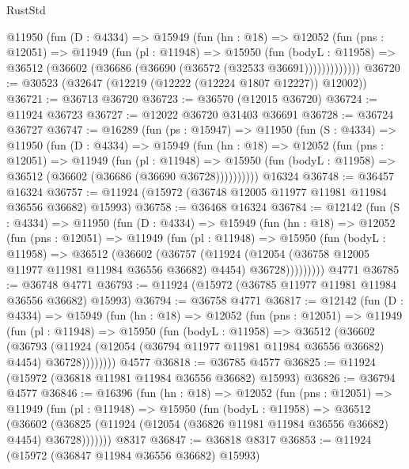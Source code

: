 \begin{lexlean}{RustStd}
\begin{coremodule}
{\begin{coremodule}
{{{{{{{{{{{{{{{{{{{{{{{{{{{{{{{{{{{{{{{{{{{{{{{{{{{{{{{{{{{{{{{{{{{{{{{{{{{{{{{{        @11950
          (fun (D : @4334) =>
          @15949
            (fun (hn : @18) =>
            @12052
              (fun (pns : @12051) =>
              @11949
                (fun (pl : @11948) =>
                @15950
                  (fun (bodyL : @11958) =>
                  @36512 (@36602 (@36686 (@36690 (@36572 (@32533 @36691)))))))))))))
@36720 := @30523 (@32647 (@12219 (@12222 (@12224 @1807 @12227)) @12002))
@36721 := @36713 @36720
@36723 := @36570 (@12015 @36720)
@36724 := @11924 @36723
@36727 := @12022 @36720 @31403 @36691
@36728 := @36724 @36727
@36747 := @16289
    (fun (ps : @15947) =>
    @11950
      (fun (S : @4334) =>
      @11950
        (fun (D : @4334) =>
        @15949
          (fun (hn : @18) =>
          @12052
            (fun (pns : @12051) =>
            @11949
              (fun (pl : @11948) =>
              @15950 (fun (bodyL : @11958) => @36512 (@36602 (@36686 (@36690 @36728))))))))))
    @16324
@36748 := @36457 @16324
@36757 := @11924 (@15972 (@36748 @12005 @11977 @11981 @11984 @36556 @36682) @15993)
@36758 := @36468 @16324
@36784 := @12142
    (fun (S : @4334) =>
    @11950
      (fun (D : @4334) =>
      @15949
        (fun (hn : @18) =>
        @12052
          (fun (pns : @12051) =>
          @11949
            (fun (pl : @11948) =>
            @15950
              (fun (bodyL : @11958) =>
              @36512
                (@36602
                  (@36757
                    (@11924
                      (@12054 (@36758 @12005 @11977 @11981 @11984 @36556 @36682) @4454)
                      @36728)))))))))
    @4771
@36785 := @36748 @4771
@36793 := @11924 (@15972 (@36785 @11977 @11981 @11984 @36556 @36682) @15993)
@36794 := @36758 @4771
@36817 := @12142
    (fun (D : @4334) =>
    @15949
      (fun (hn : @18) =>
      @12052
        (fun (pns : @12051) =>
        @11949
          (fun (pl : @11948) =>
          @15950
            (fun (bodyL : @11958) =>
            @36512
              (@36602
                (@36793
                  (@11924 (@12054 (@36794 @11977 @11981 @11984 @36556 @36682) @4454) @36728))))))))
    @4577
@36818 := @36785 @4577
@36825 := @11924 (@15972 (@36818 @11981 @11984 @36556 @36682) @15993)
@36826 := @36794 @4577
@36846 := @16396
    (fun (hn : @18) =>
    @12052
      (fun (pns : @12051) =>
      @11949
        (fun (pl : @11948) =>
        @15950
          (fun (bodyL : @11958) =>
          @36512
            (@36602
              (@36825 (@11924 (@12054 (@36826 @11981 @11984 @36556 @36682) @4454) @36728)))))))
    @8317
@36847 := @36818 @8317
@36853 := @11924 (@15972 (@36847 @11984 @36556 @36682) @15993)
}}}}}}}}}}}}}}}}}}}}}}}}}}}}}}}}}}}}}}}}}}}}}}}}}}}}}}}}}}}}}}}}}}}}}}}}}}}}}}}}
\end{coremodule}}
\end{coremodule}
\end{lexlean}
